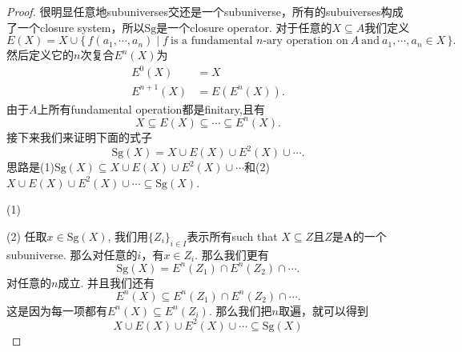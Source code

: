 \documentclass{article}
\newcommand\Set[2]{\{\,#1\mid#2\,\}} %
\newcommand\Sg{\text{Sg}}
\begin{document}
\begin{proof}
很明显任意地subuniverses交还是一个subuniverse，所有的subuiverses构成了一个closure system，所以$\Sg$是一个closure operator. 对于任意的$X \subseteq A$我们定义
$$
E(X) = X \cup \Set{f(a_1,\cdots,a_n)}{f\ \text{is a fundamental $n$-ary operation on}\ A\ \text{and}\ a_1,\cdots,a_n \in X}. 
$$
然后定义它的$n$次复合$E^n(X)$为
$$
\begin{aligned}
E^0(X) &= X \\
E^{n+1}(X) &= E(E^n(X)).
\end{aligned}
$$
由于$A$上所有fundamental operation都是finitary,且有
$$
X \subseteq E(X) \subseteq \cdots \subseteq E^n(X).
$$
接下来我们来证明下面的式子
$$
\Sg(X) = X \cup E(X) \cup E^2(X) \cup \cdots.
$$
思路是(1)$\Sg(X) \subseteq X \cup E(X) \cup E^2(X) \cup \cdots$和(2)$X \cup E(X) \cup E^2(X) \cup \cdots \subseteq \Sg(X)$. 

(1) 

(2) 任取$x \in \Sg(X)$, 我们用$\{Z_i\}_{i \in I}$表示所有such that $X \subseteq Z$且$Z$是$\mathbf{A}$的一个subuniverse. 那么对任意的$i$，有$x \in Z_i$. 那么我们更有
$$
\Sg(X) = E^n(Z_1) \cap E^n(Z_2) \cap \cdots.
$$
对任意的$n$成立. 并且我们还有
$$
E^n(X) \subseteq E^n(Z_1) \cap E^n(Z_2) \cap \cdots.
$$
这是因为每一项都有$E^n(X) \subseteq E^n(Z_i)$. 那么我们把$n$取遍，就可以得到
$$
X \cup E(X) \cup E^2(X) \cup \cdots \subseteq \Sg(X)
$$
\end{proof}
\end{document}
